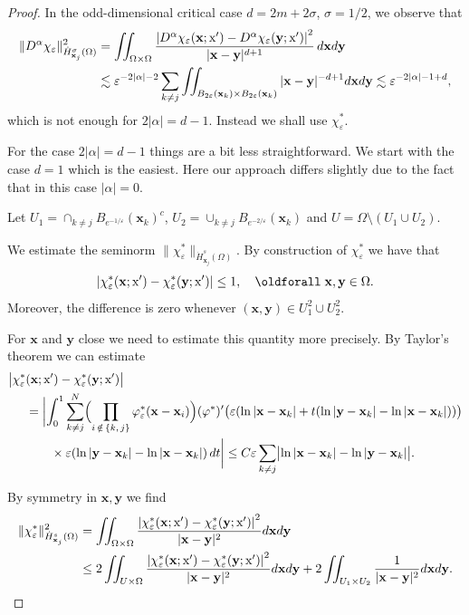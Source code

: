 \documentclass[AHL, Unicode, longabstracts, published]{cedram}
\newcommand*\eps{\varepsilon}
\newcommand\1{{\ensuremath {\mathds 1} }}
\newcommand{\bx}{\mathbf{x}}
\newcommand{\by}{\mathbf{y}}
\newcommand{\sx}{\textup{x}}
\renewcommand*{\forall}{\mathrel{\oldforall}}
\begin{document}
\begin{proof}
In the odd-dimensional critical case $d=2m+2\sigma$, $\sigma = 1/2$, we observe that
\begin{align*}
\|D^\alpha \chi_\eps\|_{\dot{H}^\sigma_{\bx_j}(\Omega)}^2 &= \iint_{\Omega \times \Omega} \dfrac{\left|D^\alpha\chi_\eps(\bx;\sx') - D^\alpha\chi_\eps(\by;\sx')\right|^2}{|\bx-\by|^{d+1}}\,d\bx d\by \\
&\lesssim \eps^{-2|\alpha|-2} \sum_{k \neq j} \iint_{B_{2\eps}(\bx_k) \times B_{2\eps}(\bx_k)} |\bx - \by|^{-d+1} d\bx d\by
\lesssim \eps^{-2|\alpha|-1+d},
\end{align*}
which is not enough for $2|\alpha|=d-1$. Instead we shall use $\chi_\eps^*$.



For the case $2|\alpha|=d-1$ things are a bit less straightforward. We start with the case $d=1$ which is the easiest. Here our approach differs slightly due to the fact that in this case $|\alpha|=0$.

Let $U_1=\cap_{k\neq j} B_{e^{-1/\eps}}(\bx_k)^c$, $U_2= \cup_{k\neq j} B_{e^{-2/\eps}}(\bx_k)$ and $U= \Omega\setminus(U_1\cup U_2)$.

We estimate the seminorm $\|\chi_\eps^*\|_{\dot H^s_{\bx_j}(\Omega)}$. By construction of $\chi_\eps^{*}$ we have that
\begin{equation*}
\left|\chi_\eps^*(\bx; \sx')-\chi_\eps^*(\by; \sx')\right|\leq 1, \quad \forall \bx, \by \in \Omega.
\end{equation*}
Moreover, the difference is zero whenever $(\bx, \by) \in U_1^2 \cup U_2^2$.

For $\bx$ and $\by$ close we need to estimate this quantity more precisely. By Taylor's theorem we can estimate
\begin{align*}
\bigl|\chi_\eps^*&(\bx; \sx') - \chi_\eps^*(\by; \sx')\bigr|\\
&=
\biggl|
\int_0^1 \sum_{k\neq j}^{N}\Bigl(\prod_{i\,\notin\,\{k,\,j\}} \varphi^{*}_\eps(\bx-\bx_i)\Bigr)(\varphi^*)'\bigl(\eps(\ln|\bx-\bx_k|+t(\ln|\by-\bx_k|-\ln|\bx-\bx_k|))\bigr)\\
&\qquad\times \eps(\ln|\by-\bx_k|-\ln|\bx-\bx_k|)\,dt\biggr|
\leq C \eps \sum_{k\neq j}\bigl|{\ln|\bx-\bx_k|-\ln|\by-\bx_k|}\bigr|.
\end{align*}

By symmetry in $\bx, \by$ we find
\begin{equation}\label{eq:cc_integral_1D}
\begin{aligned}
\|\chi_\eps^*\|_{\dot H^s_{\bx_j}(\Omega)}^2 &=
\iint_{\Omega\times\Omega} \frac{\left|\chi_\eps^*(\bx; \sx')-\chi_\eps^*(\by; \sx')\right|^2}{|\bx-\by|^2}d\bx d\by\\
&\leq 2\iint_{U\times \Omega}\frac{\left|\chi_\eps^*(\bx; \sx')-\chi_\eps^*(\by; \sx')\right|^2}{|\bx-\by|^2}d\bx d\by + 2\iint_{U_1\times U_2}\frac{1}{|\bx-\by|^2}d\bx d\by.
\end{aligned}
\end{equation}


\end{proof}
\end{document}
